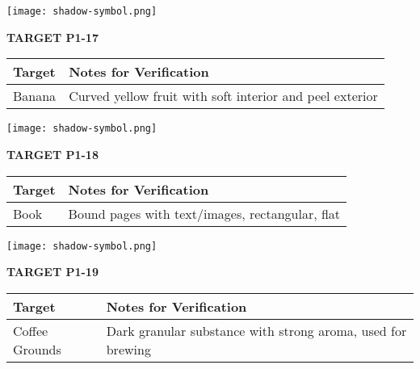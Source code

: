 \documentclass[10pt,twoside,final]{book} %
\makeatletter
\newcommand{\cleardoublepageWithSymbol}{%
  \clearpage %
  \if@twoside %
    \ifodd\c@page %
    \else %
      \thispagestyle{fancy} %
      \begingroup %
        \vspace*{0pt} %
        \vfill %
        \centering %
        \noindent 
        \texttt{[image: shadow-symbol.png]}
        \vfill %
      \endgroup
      \newpage    %
      \if@twocolumn\if@firstcolumn\else\hbox{}\newpage\fi\fi
    \fi
  \fi
}
\makeatother
\begin{document}
\cleardoublepageWithSymbol
\label{target:P1-17}
\begin{center}
\Large\textbf{TARGET P1-17}
\end{center}
\begin{mdframed}[backgroundcolor=white, linewidth=0.7pt, linecolor=rvprimary, shadow=true, shadowsize=1pt, shadowcolor=graydark!40, roundcorner=3pt]
\begin{tabular}{|p{3.5cm}|p{9cm}|}
\hline
\rowcolor{rvprimary!15}
\textbf{Target} & \textbf{Notes for Verification} \\
\hline
Banana & Curved yellow fruit with soft interior and peel exterior \\
\hline
\end{tabular}
\end{mdframed}


\cleardoublepageWithSymbol
\label{target:P1-18}
\begin{center}
\Large\textbf{TARGET P1-18}
\end{center}
\begin{mdframed}[backgroundcolor=white, linewidth=0.7pt, linecolor=rvprimary, shadow=true, shadowsize=1pt, shadowcolor=graydark!40, roundcorner=3pt]
\begin{tabular}{|p{3.5cm}|p{9cm}|}
\hline
\rowcolor{rvprimary!15}
\textbf{Target} & \textbf{Notes for Verification} \\
\hline
Book & Bound pages with text/images, rectangular, flat \\
\hline
\end{tabular}
\end{mdframed}


\cleardoublepageWithSymbol
\label{target:P1-19}
\begin{center}
\Large\textbf{TARGET P1-19}
\end{center}
\begin{mdframed}[backgroundcolor=white, linewidth=0.7pt, linecolor=rvprimary, shadow=true, shadowsize=1pt, shadowcolor=graydark!40, roundcorner=3pt]
\begin{tabular}{|p{3.5cm}|p{9cm}|}
\hline
\rowcolor{rvprimary!15}
\textbf{Target} & \textbf{Notes for Verification} \\
\hline
Coffee Grounds & Dark granular substance with strong aroma, used for brewing \\
\hline
\end{tabular}
\end{mdframed}
\end{document}
